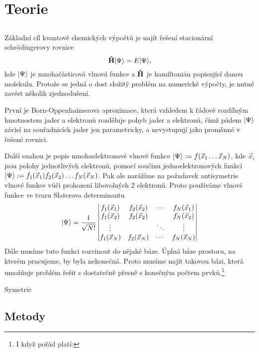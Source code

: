 \chapter{Teorie}
\section{\TD}
Základní cíl kvantově chemických výpočtů je najít řešení stacionární schrödingerovy rovnice
\begin{equation}
\mathbf{\hat{H}}| \Psi \rangle = E| \Psi \rangle,
\end{equation}
kde $| \Psi \rangle$ je mnohačásticová vlnová funkce a $\mathbf{\hat{H}}$ je hamiltonián popisující 
danou molekulu.
Protože se jedná o dost složitý problém na numerické výpočty, je nutné zavést 
několik zjednodušení. 

První je Born-Oppenhaimerova aproximace, která vzhledem k řádově 
rozdílným hmotnostem jader a elektronů rozděluje pohyb jader a elektronů, čímž pádem 
$| \Psi \rangle$ závisí na souřadnicích jader jen parametricky, 
a nevystupují jako proměnné v 
řešené rovnici. 

Další snahou je popis mnohaelektronové vlnové funkce
$| \Psi \rangle:= f(\vec{x}_1 \dots \vec{x}_N)$, kde $\vec{x}_i$ jsou 
polohy jednotlivých elektronů, pomocí součinu jednoelektronových funkcí
$| \Psi \rangle:= f_1(\vec{x}_1)f_2(\vec{x}_2)\dots f_N(\vec{x}_N)$.
Pak ale narážíme na požadavek antisymetrie vlnové funkce vůči prohození libovolných 2 
elektronů. Proto používáme vlnové funkce ve tvaru Slaterova determinantu
\begin{equation}
| \Psi \rangle = \frac{1}{\sqrt{N!}}\begin{vmatrix}
f_1(\vec{x}_1) & f_2(\vec{x}_2)& \cdots & f_N(\vec{x}_1) \\
f_1(\vec{x}_2) & f_2(\vec{x}_2)&        & f_N(\vec{x}_2)\\
\vdots         &               & \ddots & \vdots \\
f_1(\vec{x}_N) & f_2(\vec{x}_N)& \cdots & f_N(\vec{x}_N)
\end{vmatrix}
\end{equation}
Dále musíme tuto funkci rozvinout do nějaké báze. Úplná báze prostoru, na kterém 
pracujeme, by byla nekonečná. Proto musíme najít takovou bázi, která umožňuje problém 
řešit s dostatečně přesně s konečným počtem prvků.\footnote{I když pořád platí: }

\TD Symetrie \?

\section{Metody}
